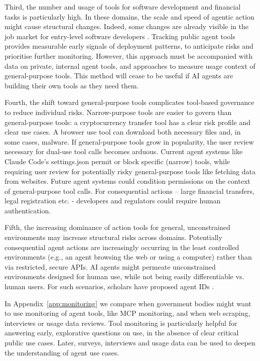 \documentclass[manuscript,screen,nonacm,oneside]{acmart}
\begin{document}
Third, the number and usage of tools for software development and financial tasks is particularly high. In these domains, the scale and speed of agentic action might cause structural changes. Indeed, some changes are already visible in the job market for entry-level software developers \citep{brynjolfsson2025canaries}. Tracking public agent tools provides measurable early signals of deployment patterns, to anticipate risks and prioritise further monitoring. However, this approach must be accompanied with data on private, internal agent tools, and approaches to measure usage context of general-purpose tools. This method will cease to be useful if AI agents are building their own tools as they need them. 

Fourth, the shift toward general-purpose tools complicates tool-based governance to reduce individual risks. Narrow-purpose tools are easier to govern than general-purpose tools: a cryptocurrency transfer tool has a clear risk profile and clear use cases. A browser use tool can download both necessary files and, in some cases, malware. If general-purpose tools grow in popularity, the user review necessary for dual-use tool calls becomes arduous. Current agent systems like Claude Code's settings.json permit or block specific (narrow) tools, while requiring user review for potentially risky general-purpose tools like fetching data from websites. Future agent systems could condition permissions on the context of general-purpose tool calls. For consequential actions -- large financial transfers, legal registration etc. - developers and regulators could require human authentication.

Fifth, the increasing dominance of action tools for general, unconstrained environments may increase structural risks across domains. Potentially consequential agent actions are  increasingly occurring in the least controlled environments (e.g., an agent browsing the web or using a computer) rather than via restricted, secure APIs. AI agents might permeate unconstrained environments designed for human use, while not being easily differentiable vs. human users. For such scenarios, scholars have proposed agent IDs \citep{chan2024ids}.

In Appendix~\ref{app:monitoring} we compare when government bodies might want to use monitoring of agent tools, like MCP monitoring, and when web scraping, interviews or usage data reviews. Tool monitoring is particularly helpful for answering early, explorative questions on use, in the absence of clear critical public use cases. Later, surveys, interviews and usage data can be used to deepen the understanding of agent use cases. 
\end{document}

